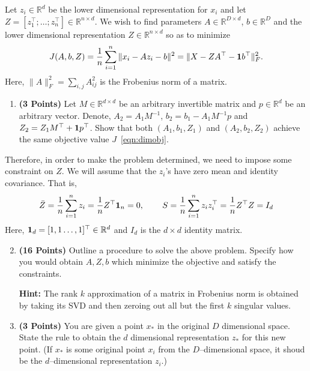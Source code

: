\documentclass[a4paper]{article}
\newcommand*{\one}{{\bf 1}}
\newcommand{\Zbar}{\bar{Z}}
\theoremstyle{definition}
\newcommand{\RR}{\mathbb{R}}
\begin{document}
Let $z_i\in \RR^d$ be the lower dimensional representation for $x_i$ and
let $Z = [z_1^\top; \dots; z_n^\top] \in \RR^{n\times d}$.
We wish to find parameters $A \in \RR^{D\times d}$, $b\in\RR^D$ and the lower
dimensional representation $Z\in \RR^{n\times d}$ so as to minimize
\begin{equation}
	J(A,b,Z) = \frac{1}{n} \sum_{i=1}^n \|x_i - Az_i - b\|^2 = \| X - ZA^\top - \one b^\top\|_F^2.
	\label{eqn:dimobj}
\end{equation}
Here, $\|A\|^2_F = \sum_{i,j} A_{ij}^2$ is the Frobenius norm of a matrix.


\begin{enumerate}
	\item \textbf{(3 Points)}
	      Let $M\in\RR^{d\times d}$ be an arbitrary invertible matrix and $p\in\RR^{d}$ be an arbitrary vector.
	      Denote, $A_2 = A_1M^{-1}$, $b_2 = b_1- A_1M^{-1}p$ and $Z_2 = Z_1 M^\top +
		      \one p^\top$.
	      Show that both
	      $(A_1, b_1, Z_1)$ and $(A_2, b_2, Z_2)$ achieve the same objective value $J$~\eqref{eqn:dimobj}.
\end{enumerate}

Therefore, in order to make the problem determined, we need to impose some
constraint on $Z$. We will assume that the $z_i$'s have zero mean and identity covariance.
That is,
\begin{align*}
	\Zbar = \frac{1}{n} \sum_{i=1}^n z_i =\frac{1}{n} Z^\top {\bf 1}_n = 0, \hspace{0.3in}
	S = \frac{1}{n} \sum_{i=1}^n z_i z_i^\top
	= \frac{1}{n} Z^\top Z
	= I_d
\end{align*}
Here, ${\bf 1}_d = [1, 1 \dots, 1]^\top \in\RR^d$ and $I_d$  is the $d\times d$ identity matrix.

\begin{enumerate}
	\setcounter{enumi}{1}
	\item \textbf{(16 Points)}
	      Outline a procedure to solve the above problem. Specify how you
	      would obtain $A, Z, b$ which minimize the objective and satisfy the constraints.

	      \textbf{Hint: }The rank $k$ approximation of a matrix in Frobenius norm is obtained by
	      taking its SVD and then zeroing out all but the first $k$ singular values.

	\item \textbf{(3 Points)}
	      You are given a point $x_*$ in the original $D$ dimensional space.
	      State the rule to obtain the $d$ dimensional
	      representation $z_*$ for this new point.
	      (If $x_*$ is some original point $x_i$ from the $D$--dimensional space, it shoud be the
	      $d$--dimensional representation $z_i$.)


\end{enumerate}
\end{document}
